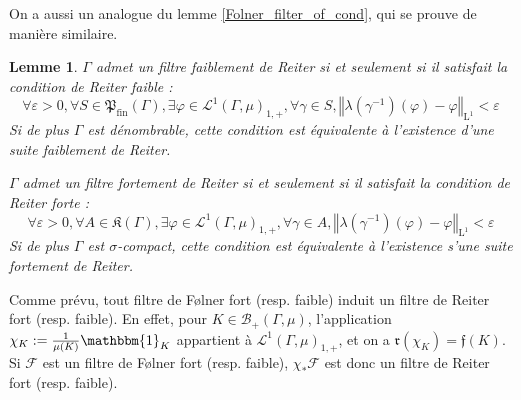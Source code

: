 \documentclass[a4paper,12pt]{article}
\newtheorem{lemma}[theorem]{Lemme}
\newtheorem{remark}[theorem]{Remarque}
\newcommand{\Bor}{\mathcal{B}}
\newcommand{\norm}[1]{\left\Vert #1\right\Vert}
\newcommand{\indic}{\mathbbm{1}}
\newcommand{\ssi}{si et seulement si }
\newcommand{\inv}{^{-1}}
\newcommand{\finparts}{\mathfrak{P}_{\mathrm{fin}}}
\begin{document}
On a aussi un analogue du lemme \ref{Folner_filter_of_cond}, qui se prouve de manière similaire.

\begin{lemma}\label{Reiter_filter_of_cond}
    $\Gamma$ admet un filtre faiblement de Reiter \ssi il satisfait la 
    \emph{condition de Reiter faible} :
    \begin{equation}\label{weak_Reiter_cond}\tag{WR}
        \forall\varepsilon>0, \forall S\in\finparts(\Gamma), \exists \varphi\in\mathscr{L}^1(\Gamma, \mu)_{1,+}, \forall \gamma\in S,
        \norm{\lambda(\gamma\inv)(\varphi)-\varphi}_{\mathrm{L}^1}<\varepsilon
    \end{equation}
    Si de plus $\Gamma$ est dénombrable, cette condition est équivalente à l'existence d'une \emph{suite} faiblement de Reiter.

    $\Gamma$ admet un filtre fortement de Reiter \ssi il satisfait la \emph{condition de Reiter forte} : 
    \begin{equation}\label{strong_Reiter_cond}\tag{SR}
        \forall\varepsilon>0, \forall A\in\mathfrak{K}(\Gamma), \exists\varphi\in\mathscr{L}^1(\Gamma, \mu)_{1,+}, \forall\gamma\in A, 
        \norm{\lambda(\gamma\inv)(\varphi)-\varphi}_{\mathrm{L}^1}<\varepsilon
    \end{equation}
    Si de plus $\Gamma$ est $\sigma$-compact, cette condition est équivalente à l'existence s'une \emph{suite} fortement de Reiter.
\end{lemma}

Comme prévu, tout filtre de F\o{}lner fort (resp. faible) induit un filtre de Reiter fort (resp. faible). En effet, pour $K\in\Bor_+(\Gamma, \mu)$, l'application 
$\chi_K:=\frac1{\mu(K)}\indic_K$ appartient à $\mathscr{L}^1(\Gamma, \mu)_{1,+}$, et on a $\mathfrak{r}(\chi_K) = \mathfrak{f}(K)$.
Si $\mathscr{F}$ est un filtre de F\o{}lner fort (resp. faible), $\chi_*\mathscr{F}$ est donc un filtre de Reiter fort (resp. faible).

\end{document}
